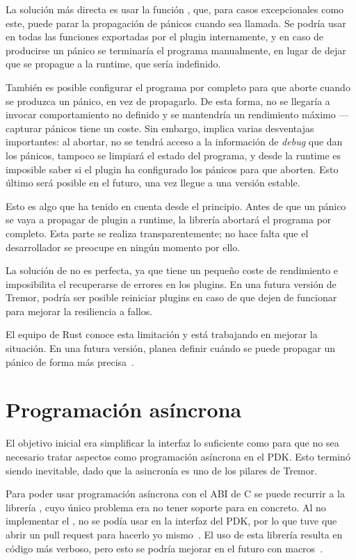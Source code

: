 La solución más directa es usar la función , que,
para casos excepcionales como este, puede parar la propagación de pánicos cuando
sea llamada. Se podría usar en todas las funciones exportadas por el plugin
internamente, y en caso de producirse un pánico se terminaría el programa
manualmente, en lugar de dejar que se propague a la runtime, que sería
indefinido.

También es posible configurar el programa por completo para que aborte cuando se
produzca un pánico, en vez de propagarlo. De esta forma, no se llegaría a
invocar comportamiento no definido y se mantendría un rendimiento máximo ---
capturar pánicos tiene un coste. Sin embargo, implica varias desventajas
importantes: al abortar, no se tendrá acceso a la información de \emph{debug}
que dan los pánicos, tampoco se limpiará el estado del programa, y desde la
runtime es imposible saber si el plugin ha configurado los pánicos para que
aborten. Esto último será posible en el futuro, una vez
 llegue a una versión estable.

Esto es algo que \abistable ha tenido en cuenta desde el principio. Antes de que
un pánico se vaya a propagar de plugin a runtime, la librería abortará el
programa por completo. Esta parte se realiza transparentemente; no hace falta
que el desarrollador se preocupe en ningún momento por ello.

La solución de \abistable no es perfecta, ya que tiene un pequeño coste de
rendimiento e imposibilita el recuperarse de errores en los plugins. En una
futura versión de Tremor, podría ser posible reiniciar plugins en caso de que
dejen de funcionar para mejorar la resiliencia a fallos.

El equipo de Rust conoce esta limitación y está trabajando en mejorar la
situación. En una futura versión, planea definir cuándo se puede propagar un
pánico de forma más precisa~\cite{cunwind}.

\section{Programación asíncrona}

El objetivo inicial era simplificar la interfaz lo suficiente como para que no
sea necesario tratar aspectos como programación asíncrona en el PDK. Esto
terminó siendo inevitable, dado que la asincronía es uno de los pilares de
Tremor.

Para poder usar programación asíncrona con el ABI de C se puede recurrir a la
librería , cuyo único problema era no tener soporte para
\abistable en concreto. Al no implementar el \trait {}, no se
podía usar en la interfaz del PDK, por lo que tuve que abrir un pull request
para hacerlo yo mismo~\cite{asyncfficontrib}. El uso de esta librería resulta en
código más verboso, pero esto se podría mejorar en el futuro con
macros~\cite{asyncffimacro}.

